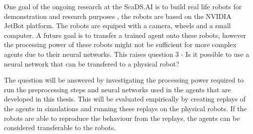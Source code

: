 One goal of the ongoing research at the ScaDS.AI is to build real life robots for demonstration and research purposes \autocite{merlin_flach}, the robots are based on the NVIDIA JetBot platform. The robots are equiped with a camera, wheels and a small computer. A future goal is to transfer a trained agent onto these robots, however the processing power of these robots might not be sufficient for more complex agents due to their neural networks. This raises question 3 - Is it possible to use a neural network that can be transfered to a physical robot?


The question will be answered by investigating the processing power required to run the preprocessing steps and neural networks used in the agents that are developed in this thesis. This will be evaluated empirically by creating replays of the agents in simulations and running these replays on the physical robots. If the robots are able to reproduce the behaviour from the replays, the agents can be considered transferable to the robots.








